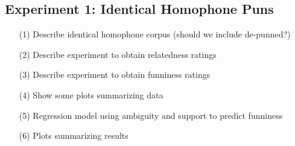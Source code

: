\documentclass[10pt,letterpaper]{article}
\begin{document}
\subsection{Experiment 1: Identical Homophone Puns}
\begin{itemize}
\item[(1)] Describe identical homophone corpus (should we include de-punned?)
\item[(2)] Describe experiment to obtain relatedness ratings
\item[(3)] Describe experiment to obtain funniness ratings
\item[(4)] Show some plots summarizing data
\item[(5)] Regression model using ambiguity and support to predict funniness
\item[(6)] Plots summarizing results
\end{itemize}
\end{document}
